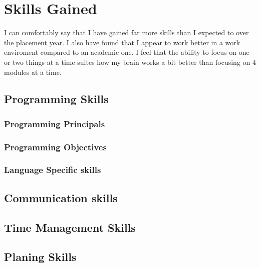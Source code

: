 \section{Skills Gained}{
	I can comfortably say that I have gained far more skills than I expected to over the placement year. I also have found that I appear to work better in a work enviroment compared to an academic one. I feel that the ability to focus on one or two things at a time suites how my brain works a bit better than focusing on 4 modules at a time.
	\subsection{Programming Skills}{
		\subsubsection*{Programming Principals}{}
		\subsubsection*{Programming Objectives}{}
		\subsubsection*{Language Specific skills}{}
}
	\subsection{Communication skills}{}
	\subsection{Time Management Skills}{}
	\subsection{Planing Skills}{}
}